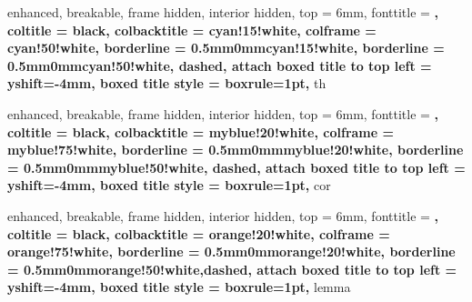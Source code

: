 \usepackage[american]{babel}
\usepackage[tt=false, type1=true]{libertine}
\usepackage{charter}
\usepackage{enumitem}
\usepackage{csquotes}
\usepackage[normalem]{ulem}
\usepackage{titlesec}
\usepackage{parskip}
\usepackage{microtype}

\usepackage{amsmath, amsfonts, amsthm, amssymb, mathtools}
\usepackage{siunitx}
\usepackage[makeroom]{cancel}
\usepackage{xfrac}
\usepackage[f]{esvect} %

\usepackage[dvipsnames]{xcolor}
\usepackage{fancyhdr}
\usepackage[margin=2cm]{geometry}
\usepackage{tikz}
\usepackage[most,many,breakable]{tcolorbox}
\usepackage{caption}
\usepackage{subcaption}
\usepackage{booktabs}
\usepackage{float}
\usepackage{listings}
\usepackage[numbered]{matlab-prettifier}

\usepackage{varwidth}

\usepackage{hyperref,theoremref}

\setlength{\parindent}{0pt}



{%
	enhanced,
	breakable,
	frame hidden,
  interior hidden,
  top = 6mm,
  fonttitle = \bfseries,
	coltitle = black,
  colbacktitle = cyan!15!white,
  colframe = cyan!50!white,
  borderline = {0.5mm}{0mm}{cyan!15!white},
  borderline = {0.5mm}{0mm}{cyan!50!white, dashed},
  attach boxed title to top left = {yshift=-4mm},
  boxed title style = {boxrule=1pt}, 
}{th}

{%
	enhanced,
	breakable,
	frame hidden,
	interior hidden,
	top = 6mm,
	fonttitle = \bfseries,
	coltitle = black,
	colbacktitle = myblue!20!white,
	colframe = myblue!75!white,
	borderline = {0.5mm}{0mm}{myblue!20!white},
	borderline = {0.5mm}{0mm}{myblue!50!white, dashed},
	attach boxed title to top left = {yshift=-4mm},
	boxed title style = {boxrule=1pt},
}{cor}

{%
	enhanced,
	breakable,
	frame hidden,
	interior hidden,
	top = 6mm,
	fonttitle = \bfseries,
	coltitle = black,
	colbacktitle = orange!20!white,
	colframe = orange!75!white,
	borderline = {0.5mm}{0mm}{orange!20!white},
	borderline = {0.5mm}{0mm}{orange!50!white,dashed},
	attach boxed title to top left = {yshift=-4mm},
	boxed title style = {boxrule=1pt},
}{lemma}

